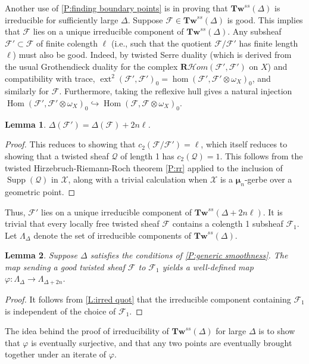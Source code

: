 \documentclass[11pt]{amsart}
\newcommand{\ms}[1]{\mathscr #1}
\renewcommand{\phi}{\varphi}
\renewcommand{\hom}{\operatorname{Hom}}
\newcommand{\shom}{\ms H\!om}
\newcommand{\rshom}{\mathbf{R}\shom}
\newcommand{\m}{\boldsymbol{\mu}}
\DeclareMathOperator{\dimhom}{hom}
\DeclareMathOperator{\dimext}{ext}
\renewcommand{\[}{[\!\hspace{0.03em}[}
\renewcommand{\]}{]\!\hspace{0.03em}]}
\renewcommand{\(}{(\!\hspace{0.03em}(}
\renewcommand{\)}{)\!\hspace{0.03em})}
\DeclareMathOperator*{\tensor}{\otimes}
\newcommand{\inj}{\hookrightarrow}
\newcommand{\Tw}{\mathbf{Tw}}
\newtheorem{lem}{Lemma}[subsubsection]%
\theoremstyle{definition}
\theoremstyle{remark}
\begin{document}
Another use of \ref{P:finding boundary points} is in proving that 
$\Tw^{ss}(\Delta)$ is irreducible for sufficiently large $\Delta$.  Suppose $\ms 
F\in\Tw^{ss}(\Delta)$ is good.  This implies that $\ms F$ lies on a 
unique irreducible component of $\Tw^{ss}(\Delta)$.  Any subsheaf 
$\ms F'\subset \ms F$ of finite colength $\ell$ (i.e., such that the 
quotient $\ms F/\ms F'$ has finite length $\ell$) must also be good.  
Indeed, by twisted Serre duality (which is derived from the usual Grothendieck duality for the complex $\rshom(\ms F',\ms F')$ on $X$) and compatibility with trace, 
$\dimext^{2}(\ms F',\ms F')_{0}=\dimhom(\ms F',\ms 
F'\tensor\omega_{X})_{0}$, and similarly for $\ms F$.  Furthermore, 
taking the reflexive hull gives a natural injection $\hom(\ms F',\ms 
F'\tensor\omega_{X})_{0}\inj\hom(\ms F,\ms F\tensor\omega_{X})_{0}$.

\begin{lem} $\Delta(\ms F')=\Delta(\ms F)+2n\ell$.
\end{lem}
\begin{proof} This reduces to showing that $c_{2}(\ms F/\ms 
F')=\ell$, which itself reduces to showing that a twisted sheaf $\ms 
Q$ of length 1 has $c_{2}(\ms Q)=1$.  This follows from the 
twisted Hirzebruch-Riemann-Roch theorem \ref{P:rr} applied to the inclusion 
of $\operatorname{Supp}(\ms Q)$ in $\ms X$, along with a trivial 
calculation when $\ms X$ is a $\m_{n}$-gerbe over a geometric point.
\end{proof}

Thus, $\ms F'$ lies on a unique irreducible component of 
$\Tw^{ss}(\Delta+2n\ell)$.    It is trivial that 
every locally free twisted sheaf $\ms F$ contains a colength 1 subsheaf $\ms 
F_{1}$.  Let $\Lambda_{\Delta}$ denote the set of 
irreducible components of $\Tw^{ss}(\Delta)$.

\begin{lem}\label{L:map of components} Suppose $\Delta$ satisfies the 
conditions of \ref{P:generic smoothness}.  The map sending a good 
twisted sheaf $\ms F$ to $\ms F_{1}$ yields a well-defined map 
$\phi:\Lambda_{\Delta}\to\Lambda_{\Delta+2n}$.
\end{lem}
\begin{proof} It follows from \ref{L:irred quot} that the irreducible component containing $\ms 
F_{1}$ is independent of the choice of $\ms F_{1}$.
\end{proof}

The idea behind the proof of irreducibility of $\Tw^{ss}(\Delta)$ for 
large $\Delta$ is to show that $\phi$ is eventually surjective, and 
that any two points are eventually brought together under an iterate 
of $\phi$.
\end{document}
